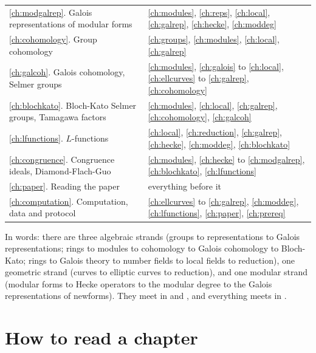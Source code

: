 \begin{center}
\begin{tabular}{@{}p{}p{}@{}}
\ref{ch:modgalrep}. Galois representations of modular forms & \ref{ch:modules}, \ref{ch:reps}, \ref{ch:local}, \ref{ch:galrep}, \ref{ch:hecke}, \ref{ch:moddeg} \\
\ref{ch:cohomology}. Group cohomology & \ref{ch:groups}, \ref{ch:modules}, \ref{ch:local}, \ref{ch:galrep} \\
\ref{ch:galcoh}. Galois cohomology, Selmer groups & \ref{ch:modules}, \ref{ch:galois} to \ref{ch:local}, \ref{ch:ellcurves} to \ref{ch:galrep}, \ref{ch:cohomology} \\
\ref{ch:blochkato}. Bloch-Kato Selmer groups, Tamagawa factors & \ref{ch:modules}, \ref{ch:local}, \ref{ch:galrep}, \ref{ch:cohomology}, \ref{ch:galcoh} \\
\ref{ch:lfunctions}. $L$-functions & \ref{ch:local}, \ref{ch:reduction}, \ref{ch:galrep}, \ref{ch:hecke}, \ref{ch:moddeg}, \ref{ch:blochkato} \\
\ref{ch:congruence}. Congruence ideals, Diamond-Flach-Guo & \ref{ch:modules}, \ref{ch:hecke} to \ref{ch:modgalrep}, \ref{ch:blochkato}, \ref{ch:lfunctions} \\
\ref{ch:paper}. Reading the paper & everything before it \\
\ref{ch:computation}. Computation, data and protocol & \ref{ch:ellcurves} to \ref{ch:galrep}, \ref{ch:moddeg}, \ref{ch:lfunctions}, \ref{ch:paper}, \ref{ch:prereq} \\
\bottomrule
\end{tabular}
\end{center}

In words: there are three algebraic strands (groups to representations to Galois representations;
rings to modules to cohomology to Galois cohomology to Bloch-Kato; rings to Galois theory to number
fields to local fields to reduction), one geometric strand (curves to elliptic curves to reduction),
and one modular strand (modular forms to Hecke operators to the modular degree to the Galois
representations of newforms). They meet in  and , and
everything meets in .

\section*{How to read a chapter}

